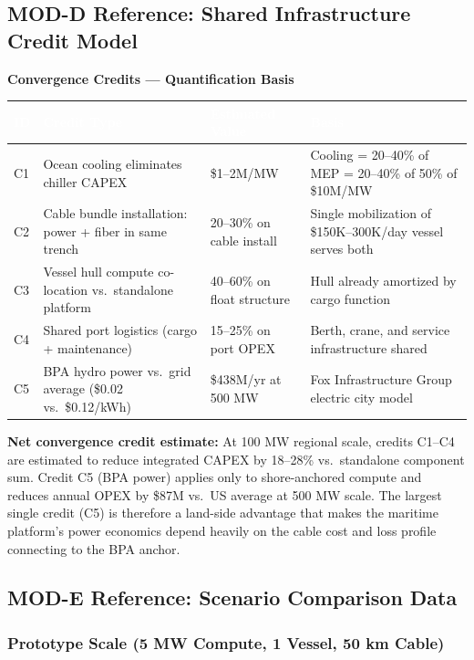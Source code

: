 \documentclass[11pt,letterpaper]{article}
\newcommand{\tableheader}[1]{\textbf{\sffamily\textcolor{white}{#1}}}
\begin{document}
\subsection{MOD-D Reference: Shared Infrastructure Credit Model}

\textbf{Convergence Credits --- Quantification Basis}

\begin{center}
\begin{tabularx}{\textwidth}{L{1cm}L{5cm}C{2.5cm}X}
\toprule
{}
\tableheader{ID} & \tableheader{Credit Type} & \tableheader{Estimated Value} & \tableheader{Basis} \\
\midrule
C1 & Ocean cooling eliminates chiller CAPEX & \$1--2M/MW & Cooling = 20--40\% of MEP = 20--40\% of 50\% of \$10M/MW \\
C2 & Cable bundle installation: power + fiber in same trench & 20--30\% on cable install & Single mobilization of \$150K--300K/day vessel serves both \\
C3 & Vessel hull compute co-location vs.\ standalone platform & 40--60\% on float structure & Hull already amortized by cargo function \\
C4 & Shared port logistics (cargo + maintenance) & 15--25\% on port OPEX & Berth, crane, and service infrastructure shared \\
C5 & BPA hydro power vs.\ grid average (\$0.02 vs.\ \$0.12/kWh) & \$438M/yr at 500 MW & Fox Infrastructure Group electric city model \\
\bottomrule
\end{tabularx}
\end{center}

\textbf{Net convergence credit estimate:} At 100 MW regional scale, credits C1--C4 are
estimated to reduce integrated CAPEX by 18--28\% vs.\ standalone component sum. Credit C5
(BPA power) applies only to shore-anchored compute and reduces annual OPEX by \$87M vs.\
US average at 500 MW scale. The largest single credit (C5) is therefore a land-side
advantage that makes the maritime platform's power economics depend heavily on the cable
cost and loss profile connecting to the BPA anchor.

\subsection{MOD-E Reference: Scenario Comparison Data}

\subsubsection{Prototype Scale (5 MW Compute, 1 Vessel, 50 km Cable)}
\end{document}
